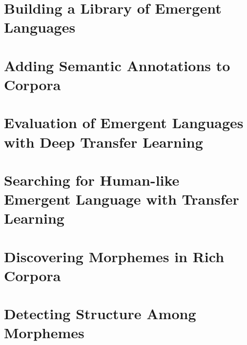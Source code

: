 






\newpage
\thispagestyle{plain}




\newpage
\tableofcontents*



\chapter{Building a Library of Emergent Languages }
\unskip\label{ch:elcc}



\chapter{Adding Semantic Annotations to Corpora }
\unskip\label{ch:rich-corpora}



\chapter{Evaluation of Emergent Languages with Deep Transfer Learning}
\unskip\label{ch:xferbench}


\chapter{Searching for Human-like Emergent Language with Transfer Learning }
\unskip\label{ch:hpo}



\chapter{Discovering Morphemes in Rich Corpora }
\unskip\label{ch:morphemes}


\chapter{Detecting Structure Among Morphemes }
\unskip\label{ch:syntax}




